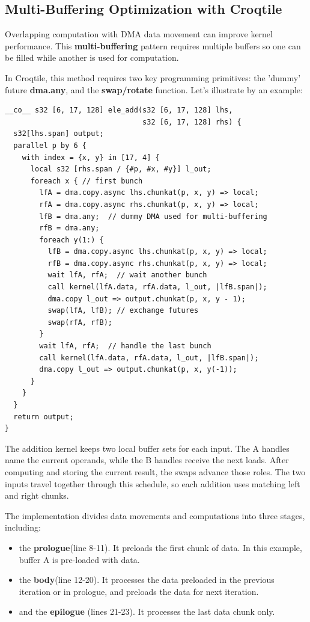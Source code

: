 \subsection*{Multi-Buffering Optimization with Croqtile}

Overlapping computation with DMA data movement can improve kernel performance. This \textbf{multi-buffering} pattern requires multiple buffers so one can be filled while another is used for computation.

In Croqtile, this method requires two key programming primitives: the 'dummy' future \textbf{dma.any}, and the \textbf{swap/rotate} function. Let's illustrate by an example:

\begin{lstlisting}[language=croqtile,caption={Multi-Buffering Optimization with Croqtile}]
__co__ s32 [6, 17, 128] ele_add(s32 [6, 17, 128] lhs,
                                s32 [6, 17, 128] rhs) {
  s32[lhs.span] output;
  parallel p by 6 {
    with index = {x, y} in [17, 4] {
      local s32 [rhs.span / {#p, #x, #y}] l_out;
      foreach x { // first bunch
        lfA = dma.copy.async lhs.chunkat(p, x, y) => local;
        rfA = dma.copy.async rhs.chunkat(p, x, y) => local;
        lfB = dma.any;  // dummy DMA used for multi-buffering
        rfB = dma.any;
        foreach y(1:) {
          lfB = dma.copy.async lhs.chunkat(p, x, y) => local;
          rfB = dma.copy.async rhs.chunkat(p, x, y) => local;
          wait lfA, rfA;  // wait another bunch
          call kernel(lfA.data, rfA.data, l_out, |lfB.span|);
          dma.copy l_out => output.chunkat(p, x, y - 1);
          swap(lfA, lfB); // exchange futures
          swap(rfA, rfB);
        }
        wait lfA, rfA;  // handle the last bunch
        call kernel(lfA.data, rfA.data, l_out, |lfB.span|);
        dma.copy l_out => output.chunkat(p, x, y(-1));
      }
    }
  }
  return output;
}
\end{lstlisting}

The addition kernel keeps two local buffer sets for each input. The A handles name the current operands, while the B handles receive the next loads. After computing and storing the current result, the swaps advance those roles. The two inputs travel together through this schedule, so each addition uses matching left and right chunks.

The implementation divides data movements and computations into three stages, including:

\begin{itemize}[leftmargin=1.6em]
\item the \textbf{prologue}(line 8-11). It preloads the first chunk of data. In this example, buffer A is pre-loaded with data.
\item the \textbf{body}(line 12-20). It processes the data preloaded in the previous iteration or in prologue, and preloads the data for next iteration.
\item and the \textbf{epilogue} (lines 21-23). It processes the last data chunk only.
\end{itemize}

